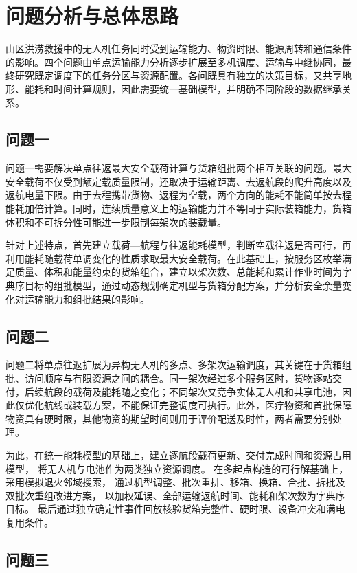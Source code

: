\documentclass[bwprint]{gmcmthesis}
\begin{document}
\section{问题分析与总体思路}

山区洪涝救援中的无人机任务同时受到运输能力、物资时限、能源周转和通信条件的影响。四个问题由单点运输能力分析逐步扩展至多机调度、运输与中继协同，最终研究既定调度下的任务分区与资源配置。各问既具有独立的决策目标，又共享地形、能耗和时间计算规则，因此需要统一基础模型，并明确不同阶段的数据继承关系。

\subsection{问题一}

问题一需要解决单点往返最大安全载荷计算与货箱组批两个相互关联的问题。最大安全载荷不仅受到额定载质量限制，还取决于运输距离、去返航段的爬升高度以及返航电量下限。由于去程携带货物、返程为空载，两个方向的能耗不能简单按去程能耗加倍计算。同时，连续质量意义上的运输能力并不等同于实际装箱能力，货箱体积和不可拆分性可能进一步限制每架次的装载量。

针对上述特点，首先建立载荷—航程与往返能耗模型，判断空载往返是否可行，再利用能耗随载荷单调变化的性质求取最大安全载荷。在此基础上，按服务区枚举满足质量、体积和能量约束的货箱组合，建立以架次数、总能耗和累计作业时间为字典序目标的组批模型，通过动态规划确定机型与货箱分配方案，并分析安全余量变化对运输能力和组批结果的影响。

\subsection{问题二}

问题二将单点往返扩展为异构无人机的多点、多架次运输调度，其关键在于货箱组批、访问顺序与有限资源之间的耦合。同一架次经过多个服务区时，货物逐站交付，后续航段的载荷及能耗随之变化；不同架次又竞争实体无人机和共享电池，因此仅优化航线或装载方案，不能保证完整调度可执行。此外，医疗物资和首批保障物资具有硬时限，其他物资的期望时间则用于评价配送及时性，两者需要分别处理。

为此，在统一能耗模型的基础上，建立逐航段载荷更新、交付完成时间和资源占用模型，
将无人机与电池作为两类独立资源调度。
在多起点构造的可行解基础上，采用模拟退火邻域搜索，
通过机型调整、批次重排、移箱、换箱、合批、拆批及双批次重组改进方案，
以加权延误、全部运输返航时间、能耗和架次数为字典序目标。
最后通过独立确定性事件回放核验货箱完整性、硬时限、设备冲突和满电复用条件。


\subsection{问题三}
\end{document}
